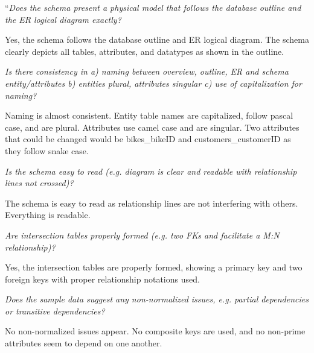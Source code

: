 \documentclass{article}
\begin{document}
\vspace{0.2cm}

\begin{tcolorbox}[colback=secondarycolor, colframe=primarycolor, title=\textbf{Step 2: Peer Review 2 - Daniel Guardado}]
``\textit{Does the schema present a physical model that follows the database outline and the ER logical diagram exactly?}

\vspace{0.2cm}
Yes, the schema follows the database outline and ER logical diagram. The schema clearly depicts all tables, attributes, and datatypes as shown in the outline.  

\vspace{0.2cm}
\textit{Is there consistency in a) naming between overview, outline, ER and schema entity/attributes b) entities plural, attributes singular c) use of capitalization for naming?}

\vspace{0.2cm}
Naming is almost consistent. Entity table names are capitalized, follow pascal case, and are plural. Attributes use camel case and are singular. Two attributes that could be changed would be bikes\_bikeID and customers\_customerID as they follow snake case. 

\vspace{0.2cm}
\textit{Is the schema easy to read (e.g. diagram is clear and readable with relationship lines not crossed)?}

\vspace{0.2cm}
The schema is easy to read as relationship lines are not interfering with others. Everything is readable. 

\vspace{0.2cm}
\textit{Are intersection tables properly formed (e.g. two FKs and facilitate a M:N relationship)?}

\vspace{0.2cm}
Yes, the intersection tables are properly formed, showing a primary key and two foreign keys with proper relationship notations used. 

\vspace{0.2cm}
\textit{Does the sample data suggest any non-normalized issues, e.g. partial dependencies or transitive dependencies?}

\vspace{0.2cm}
No non-normalized issues appear. No composite keys are used, and no non-prime attributes seem to depend on one another. 


\end{tcolorbox}
\end{document}
